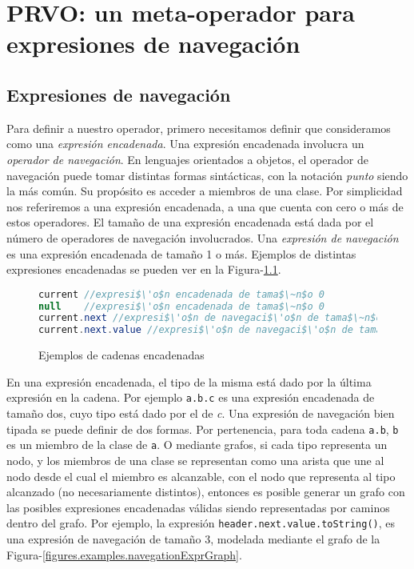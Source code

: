 \chapter[PRVO]{PRVO: un meta-operador para expresiones de navegaci\'on}
\label{cap:prvo}

\section{Expresiones de navegaci\'on}
\label{sec:prvo.navigationalExpressions}

Para definir a nuestro operador, primero necesitamos definir que consideramos como una \emph{expresi\'on encadenada}. Una expresi\'on encadenada involucra un \emph{operador de navegaci\'on}. En lenguajes orientados a objetos, el operador de navegaci\'on puede tomar distintas formas sint\'acticas, con la notaci\'on \emph{punto} siendo la m\'as com\'un. Su prop\'osito es acceder a miembros de una clase. Por simplicidad nos referiremos a una expresi\'on encadenada, a una que cuenta con cero o m\'as de estos operadores. El tama\~no de una expresi\'on encadenada est\'a dada por el n\'umero de operadores de navegaci\'on involucrados. Una \emph{expresi\'on de navegaci\'on} es una expresi\'on encadenada de tama\~no 1 o m\'as. Ejemplos de distintas expresiones encadenadas se pueden ver en la Figura-\ref{figures.examples.chainedExpr}.

\begin{figure}
	\begin{lstlisting}[mathescape=true, language=Java, extendedchars=true]
current //expresi$\'o$n encadenada de tama$\~n$o 0
null 	//expresi$\'o$n encadenada de tama$\~n$o 0
current.next //expresi$\'o$n de navegaci$\'o$n de tama$\~n$o 1
current.next.value //expresi$\'o$n de navegaci$\'o$n de tama$\~n$o 2
	\end{lstlisting}
	\caption{Ejemplos de cadenas encadenadas}
	\label{figures.examples.chainedExpr}
\end{figure}

En una expresi\'on encadenada, el tipo de la misma est\'a dado por la \'ultima expresi\'on en la cadena. Por ejemplo \lstinline|a.b.c| es una expresi\'on encadenada de tama\~no dos, cuyo tipo est\'a dado por el de \emph{c}. Una expresi\'on de navegaci\'on bien tipada se puede definir de dos formas. Por pertenencia, para toda cadena \texttt{a.b}, \texttt{b} es un miembro de la clase de \texttt{a}. O mediante grafos, si cada tipo representa un nodo, y los miembros de una clase se representan como una arista que une al nodo desde el cual el miembro es alcanzable, con el nodo que representa al tipo alcanzado (no necesariamente distintos), entonces es posible generar un grafo con las posibles expresiones encadenadas v\'alidas siendo representadas por caminos dentro del grafo. Por ejemplo, la expresi\'on \lstinline|header.next.value.toString()|, es una expresi\'on de navegaci\'on de tama\~no 3, modelada mediante el grafo de la Figura-\ref{figures.examples.navegationExprGraph}.

